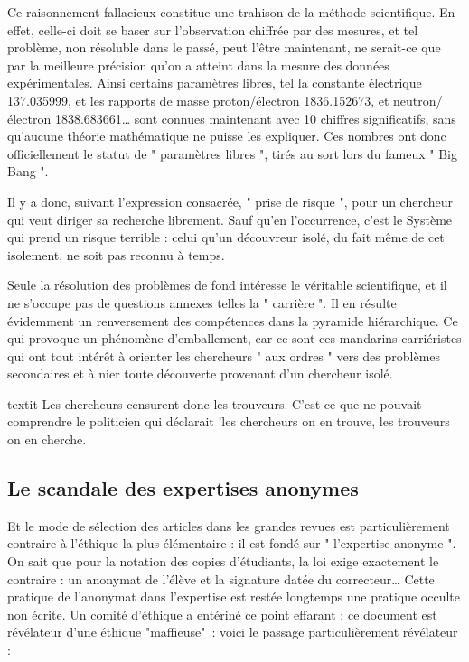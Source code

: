 \documentclass[a4paper,12pt]{article}
\begin{document}
Ce raisonnement fallacieux constitue une trahison de la méthode scientifique. En effet, celle-ci doit se baser sur l’observation chiffrée par des mesures, et tel problème, non résoluble dans le passé, peut l’être maintenant, ne serait-ce que par la meilleure précision qu’on a atteint dans la mesure des données expérimentales. Ainsi certains paramètres libres, tel la constante électrique 137.035999, et les rapports de masse proton/électron 1836.152673, et neutron/électron 1838.683661… sont connues maintenant avec 10 chiffres significatifs, sans qu’aucune théorie mathématique ne puisse les expliquer. Ces nombres ont donc officiellement le statut de " paramètres libres ", tirés au sort lors du fameux " Big Bang ".

Il y a donc, suivant l’expression consacrée, " prise de risque ", pour un chercheur qui veut diriger sa recherche librement. Sauf qu'en l’occurrence, c’est le Système qui prend un risque terrible : celui qu’un découvreur isolé, du fait même de cet isolement, ne soit pas reconnu à temps.

Seule la résolution des problèmes de fond intéresse le véritable scientifique, et il ne s’occupe pas de questions annexes telles la " carrière ". Il en résulte évidemment un renversement des compétences dans la pyramide hiérarchique. Ce qui provoque un phénomène d’emballement, car ce sont ces mandarins-carriéristes qui ont tout intérêt à orienter les chercheurs " aux ordres " vers des problèmes secondaires et à nier toute découverte provenant d’un chercheur isolé.

textit {Les chercheurs censurent donc les trouveurs}. C'est ce que ne pouvait comprendre le politicien qui déclarait 'les chercheurs on en trouve, les trouveurs on en cherche.


\subsection {Le scandale des expertises anonymes}

Et le mode de sélection des articles dans les grandes revues est particulièrement contraire à l’éthique la plus élémentaire : il est fondé sur " l’expertise anonyme ". On sait que pour la notation des copies d’étudiants, la loi exige exactement le contraire : un anonymat de l’élève et la signature datée du correcteur… Cette pratique de l’anonymat dans l’expertise est restée longtemps une pratique occulte non écrite. Un comité d’éthique a entériné ce point effarant : ce document est révélateur d’une éthique "maffieuse" : voici le passage particulièrement révélateur :
\end{document}
